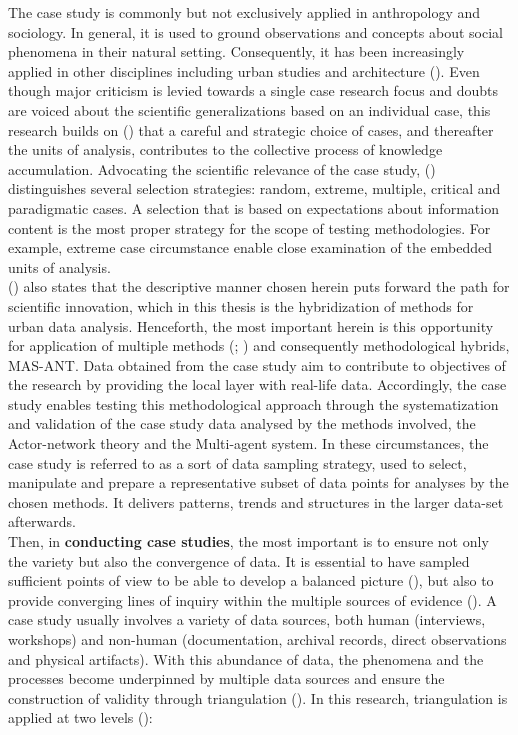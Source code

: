 \documentclass[11pt]{report}
\begin{document}
The case study is commonly but not exclusively applied in anthropology and sociology.
In general, it is used to ground observations and concepts about social phenomena in their natural setting. Consequently, it has been increasingly applied in other disciplines including urban studies and architecture (\href{Feagin}{\citealt{feagin_case_1991}}). Even though major criticism is levied towards a single case research focus and doubts are voiced about the scientific generalizations based on an individual case, this research builds on (\href{Flyvbjerg}{\citealt{flyvbjerg_five_2006}}) that a careful and strategic choice of cases, and thereafter the units of analysis, contributes to the collective process of knowledge accumulation.
Advocating the scientific relevance of the case study, (\href{Flvybjerg}{\cite{flyvbjerg_five_2006}}) distinguishes several selection strategies: random, extreme, multiple, critical and paradigmatic cases. A selection that is based on expectations about information content is the most proper strategy for the scope of testing methodologies. For example, extreme case circumstance enable close examination of the embedded units of analysis.
\\

(\href{Flvybjerg}{\cite{flyvbjerg_five_2006}}) also states that the descriptive manner chosen herein puts forward the path for scientific innovation, which in this thesis is the hybridization of methods for urban data analysis. Henceforth, the most important herein is this opportunity for application of multiple methods (\href{Yin}{\citealt{yin_case_2003}}; \href{Yin} {\citealt{yin_case_2009}}) and consequently methodological hybrids, MAS-ANT.
Data obtained from the case study aim to contribute to objectives of the research by providing the local layer with real-life data. Accordingly, the case study enables testing this methodological approach through the systematization and validation of the case study data analysed by the methods involved, the Actor-network theory and the Multi-agent system. In these circumstances, the case study is referred to as a sort of data sampling strategy, used to select, manipulate and prepare a representative subset of data points for analyses by the chosen methods. It delivers patterns, trends and structures in the larger data-set afterwards.
\\

Then, in \textbf{conducting case studies}, the most important is to ensure not only the variety but also the convergence of data. It is essential to have sampled  sufficient  points  of  view  to be able to develop a balanced picture (\href{Harrison}{\citealt{partington_case_2002}}), but also to provide converging lines of inquiry within the multiple sources of evidence (\href{Yin} {\citealt{yin_case_2009}}).
A case study usually involves a variety of data sources, both human (interviews, workshops) and non-human (documentation, archival records, direct observations and physical artifacts).
With this abundance of data, the phenomena and the processes become underpinned by multiple data sources and ensure the construction of validity through triangulation (\href{Denzin}{\citealt{denzin_research_2009}}). In this research, triangulation is applied at two levels (\href{Patton}{\citealt{patton_qualitative_2001}}):
\end{document}
